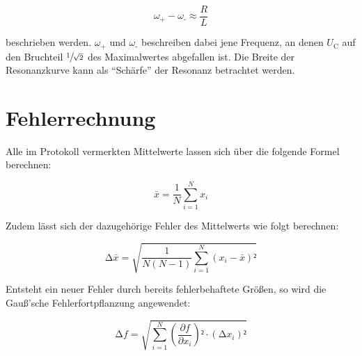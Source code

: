 \begin{equation*}
    \omega_\text{+} - \omega_\text{-} \approx \frac{R}{L}
\end{equation*}

\noindent beschrieben werden. $\omega_\text{+}$ und $\omega_\text{-}$ beschreiben dabei jene Frequenz, an denen $U_\text{C}$ auf den 
Bruchteil $\sfrac{1}{\sqrt{2}}$ des Maximalwertes abgefallen ist. Die Breite der Resonanzkurve kann als \enquote{Schärfe} der 
Resonanz betrachtet werden.


\section{Fehlerrechnung}
\label{sec:Fehlerrechnung}

Alle im Protokoll vermerkten Mittelwerte lassen sich über die folgende Formel berechnen:

\begin{equation}
\label{eqn:Mittelwert}
    \bar{x} = \frac{1}{N}\sum_{i=1}^N x_i
\end{equation}

Zudem lässt sich der dazugehörige Fehler des Mittelwerts wie folgt berechnen:

\begin{equation}
\label{eqn:Mittelwertfehler}
    \increment \bar{x} = \sqrt{\frac{1}{N\left(N-1\right)}\sum_{i=1}^N \left(x_i - \bar{x}\right)²}
\end{equation}

Entsteht ein neuer Fehler durch bereits fehlerbehaftete Größen, so wird die Gauß'sche Fehlerfortpflanzung angewendet:

\begin{equation}
\label{eqn:Fehlerfortpflanzung}
    \increment f = \sqrt{\sum_{i=1}^N \left(\frac{\partial f}{\partial x_i}\right)²\cdot\left(\increment x_i\right)²}
\end{equation}

%